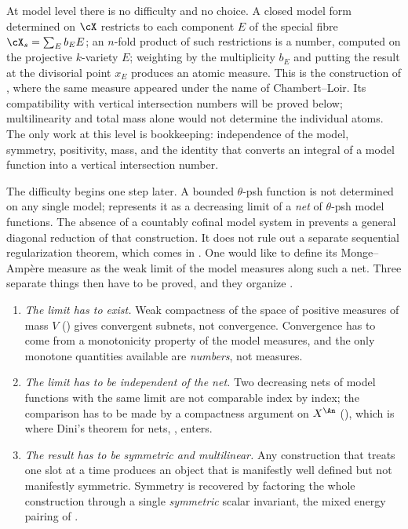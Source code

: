 At model level there is no difficulty and no choice.  A closed model form
determined on $\cX$ restricts to each component $E$ of the special fibre
$\cX_s=\sum_Eb_EE$; an $n$-fold product of such restrictions is a number,
computed on the projective $k$-variety $E$; weighting by the multiplicity
$b_E$ and putting the result at the divisorial point $x_E$ produces an
atomic measure.  This is the construction of
, where the same measure appeared under the
name of Chambert--Loir.  Its compatibility with vertical intersection
numbers will be proved below; multilinearity and total mass alone would
not determine the individual atoms.  The only work at this
level is bookkeeping: independence of the model, symmetry, positivity, mass,
and the identity that converts an integral of a model function into a
vertical intersection number.

The difficulty begins one step later.  A bounded $\theta$-psh function is
not determined on any single model;
 represents it as a decreasing limit of a
\emph{net} of $\theta$-psh model functions.  The absence of a countably
cofinal model system in  prevents a
general diagonal reduction of that construction.  It does not rule out a
separate sequential regularization theorem, which comes in
.  One
would like to define its Monge--Amp\`ere measure as the weak limit of the
model measures along such a net.  Three separate things then have to be
proved, and they organize .

\begin{enumerate}
\item\label{itm:ch24-plan:exists}
 \emph{The limit has to exist.}  Weak compactness of the space of positive
 measures of mass $V$ () gives convergent
 subnets, not convergence.  Convergence has to come from a monotonicity
 property of the model measures, and the only monotone quantities available
 are \emph{numbers}, not measures.
\item\label{itm:ch24-plan:unique}
 \emph{The limit has to be independent of the net.}  Two decreasing nets of
 model functions with the same limit are not comparable index by index; the
 comparison has to be made by a compactness argument on $X^{\An}$
 (), which is where Dini's theorem for nets,
 , enters.
\item\label{itm:ch24-plan:symmetric}
 \emph{The result has to be symmetric and multilinear.}  Any construction
 that treats one slot at a time produces an object that is manifestly
 well defined but not manifestly symmetric.  Symmetry is recovered by
 factoring the whole construction through a single \emph{symmetric} scalar
 invariant, the mixed energy pairing of .
\end{enumerate}

